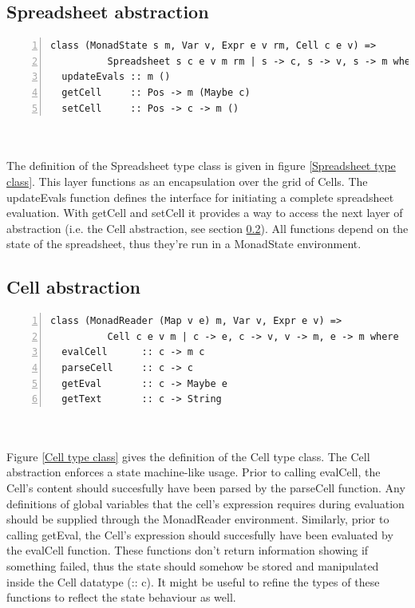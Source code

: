 \documentclass[10pt,a4paper]{article}
\begin{document}
\subsection{Spreadsheet abstraction}
\label{Spreadsheet abstraction}
\begin{minipage}{\linewidth}
\begin{Verbatim}[numbers=left,stepnumber=1,numbersep=5pt]
class (MonadState s m, Var v, Expr e v rm, Cell c e v) =>
          Spreadsheet s c e v m rm | s -> c, s -> v, s -> m where
  updateEvals :: m ()
  getCell     :: Pos -> m (Maybe c)
  setCell     :: Pos -> c -> m ()
\end{Verbatim}
\label{Spreadsheet type class}
\end{minipage}
\\\\
The definition of the Spreadsheet type class is given in figure \ref{Spreadsheet type class}.
This layer functions as an encapsulation over the grid of Cells. The updateEvals function
defines the interface for initiating a complete spreadsheet evaluation.
With getCell and setCell it provides a way to access the next layer of abstraction (i.e. the
Cell abstraction, see section \ref{Cell abstraction}). All functions depend on the state of the
spreadsheet, thus they're run in a MonadState environment.

\subsection{Cell abstraction}
\label{Cell abstraction}
\begin{minipage}{\linewidth}
\begin{Verbatim}[numbers=left,stepnumber=1,numbersep=5pt]
class (MonadReader (Map v e) m, Var v, Expr e v) =>
          Cell c e v m | c -> e, c -> v, v -> m, e -> m where
  evalCell      :: c -> m c
  parseCell     :: c -> c
  getEval       :: c -> Maybe e
  getText       :: c -> String
\end{Verbatim}
\label{Cell type class}
\end{minipage}
\\\\
Figure \ref{Cell type class} gives the definition of the Cell type class.
The Cell abstraction enforces a state machine-like usage. Prior to calling evalCell, the Cell's
content should succesfully have been parsed by the parseCell function. Any definitions of
global variables that the cell's expression requires during evaluation should be supplied through
the MonadReader environment. Similarly, prior to calling getEval, the Cell's expression should
succesfully have been evaluated by the evalCell function. These functions don't return information
showing if something failed, thus the state should somehow be stored and manipulated inside the
Cell datatype (:: c). It might be useful to refine the types of these functions to reflect the
state behaviour as well.
\end{document}
